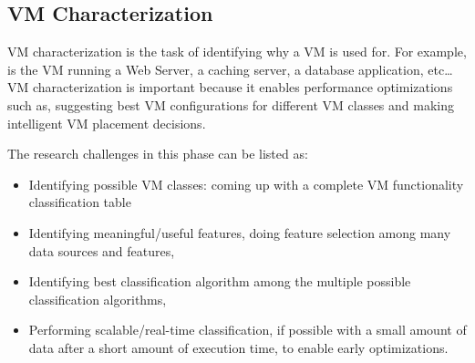 \subsection{VM Characterization}
VM characterization is the task of identifying why a VM is used for. For example, is the VM running a Web Server, a caching server, a database application, etc… VM characterization is important because it enables performance optimizations such as, suggesting best VM configurations for different VM classes and making intelligent VM placement decisions. 

The research challenges in this phase can be listed as:
\begin{itemize}
\item Identifying possible VM classes: coming up with a complete VM functionality classification table
\item Identifying meaningful/useful features, doing feature selection among many data sources and features, 
\item Identifying best classification algorithm among the multiple possible classification algorithms, 
\item Performing scalable/real-time classification, if possible with a small amount of data after a short amount of execution time, to enable early optimizations.  
\end{itemize}